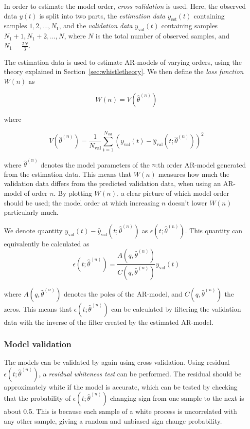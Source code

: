 \documentclass{IEEEtran}
\newcommand{\val}[1]{#1_{\text{val}}}
\newcommand{\est}[1]{#1_{\text{est}}}
\begin{document}
In order to estimate the model order, \textit{cross validation} is used.
Here, the observed data $y(t)$ is split into two
parts, the \textit{estimation data} $\est{y}(t)$ containing samples $1,
2,\ldots,N_1$, and
the \textit{validation data} $\val{y}(t)$ containing samples $N_1 + 1, N_1 + 2,
\ldots,N$,
where $N$ is the total number of observed
samples, and $N_1 = \frac{2N}{3}$.

The estimation data is used to estimate AR-models of varying orders, using
the theory explained in Section~\ref{sec:whistletheory}. We then define the
\textit{loss function} $W(n)$ as

\begin{equation}
    W(n) = V(\hat{\theta}^{(n)})
\end{equation}

where

\begin{equation}
    V(\hat{\theta}^{(n)}) = \frac{1}{\val{N}}\sum^{\val{N}}_{t=1}(\val{y}(t) -
        \val{\hat{y}}(t;\hat{\theta}^{(n)}))^2
\end{equation}

where $\hat{\theta}^{(n)}$ denotes the model parameters of the $n$:th order
AR-model generated from the estimation data. This means that $W(n)$ measures
how much the validation data differs from the predicted validation data, when
using an AR-model of order $n$. By plotting $W(n)$, a
clear picture of which model order should be used; the model order at which
increasing $n$ doesn't lower $W(n)$ particularly much.

We denote quantity $\val{y}(t) - \val{\hat{y}}(t;\hat{\theta}^{(n)})$ as
$\epsilon(t;\hat{\theta}^{(n)})$. This quantity can equivalently be calculated
as
\begin{equation}
    \epsilon(t;\hat{\theta}^{(n)}) =
    \frac{A(q,\hat{\theta}^{(n)})}{C(q,\hat{\theta}^{(n)})}\val{y}(t)
\end{equation}

where $A(q,\hat{\theta}^{(n)})$ denotes the poles of the AR-model, and
$C(q,\hat{\theta}^{(n)})$ the zeros. This means that
$\epsilon(t;\hat{\theta}^{(n)})$ can be calculated by filtering the validation
data with the inverse of the filter created by the estimated AR-model.

\subsubsection{Model validation}
\label{ssub:modelvalidation}
The models can be validated by again using cross validation. Using residual
$\epsilon(t;\hat{\theta}^{(n)})$, a \textit{residual whiteness test} can be
performed. The residual should be approximately white if the model is accurate,
which can be tested by checking that the probability of
$\epsilon(t;\hat{\theta}^{(n)})$ changing sign from one sample to the next is
about 0.5. This is because each sample of a white process is uncorrelated with
any other sample, giving a random and unbiased sign change probability.
\end{document}
